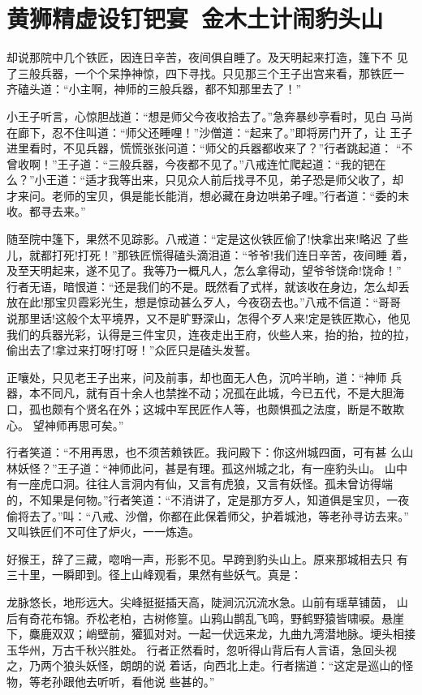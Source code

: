 \chapter{黄狮精虚设钉钯宴~金木土计闹豹头山}

却说那院中几个铁匠，因连日辛苦，夜间俱自睡了。及天明起来打造，篷下不
见了三般兵器，一个个呆挣神惊，四下寻找。只见那三个王子出宫来看，那铁匠一
齐磕头道：“小主啊，神师的三般兵器，都不知那里去了！”

小王子听言，心惊胆战道：“想是师父今夜收拾去了。”急奔暴纱亭看时，见白
马尚在廊下，忍不住叫道：“师父还睡哩！”沙僧道：“起来了。”即将房门开了，让
王子进里看时，不见兵器，慌慌张张问道：“师父的兵器都收来了？”行者跳起道：
“不曾收啊！”王子道：“三般兵器，今夜都不见了。”八戒连忙爬起道：“我的钯在
么？”小王道：“适才我等出来，只见众人前后找寻不见，弟子恐是师父收了，却
才来问。老师的宝贝，俱是能长能消，想必藏在身边哄弟子哩。”行者道：“委的未
收。都寻去来。”

随至院中篷下，果然不见踪影。八戒道：“定是这伙铁匠偷了!快拿出来!略迟
了些儿，就都打死!打死！”那铁匠慌得磕头滴泪道：“爷爷!我们连日辛苦，夜间睡
着，及至天明起来，遂不见了。我等乃一概凡人，怎么拿得动，望爷爷饶命!饶命！”
行者无语，暗恨道：“还是我们的不是。既然看了式样，就该收在身边，怎么却丢
放在此!那宝贝霞彩光生，想是惊动甚么歹人，今夜窃去也。”八戒不信道：“哥哥
说那里话!这般个太平境界，又不是旷野深山，怎得个歹人来!定是铁匠欺心，他见
我们的兵器光彩，认得是三件宝贝，连夜走出王府，伙些人来，抬的抬，拉的拉，
偷出去了!拿过来打呀!打呀！”众匠只是磕头发誓。

正嚷处，只见老王子出来，问及前事，却也面无人色，沉吟半晌，道：“神师
兵器，本不同凡，就有百十余人也禁挫不动；况孤在此城，今已五代，不是大胆海
口，孤也颇有个贤名在外；这城中军民匠作人等，也颇惧孤之法度，断是不敢欺心。
望神师再思可矣。”

行者笑道：“不用再思，也不须苦赖铁匠。我问殿下：你这州城四面，可有甚
么山林妖怪？”王子道：“神师此问，甚是有理。孤这州城之北，有一座豹头山。
山中有一座虎口洞。往往人言洞内有仙，又言有虎狼，又言有妖怪。孤未曾访得端
的，不知果是何物。”行者笑道：“不消讲了，定是那方歹人，知道俱是宝贝，一夜
偷将去了。”叫：“八戒、沙僧，你都在此保着师父，护着城池，等老孙寻访去来。”
又叫铁匠们不可住了炉火，一一炼造。

好猴王，辞了三藏，唿哨一声，形影不见。早跨到豹头山上。原来那城相去只
有三十里，一瞬即到。径上山峰观看，果然有些妖气。真是：

龙脉悠长，地形远大。尖峰挺挺插天高，陡涧沉沉流水急。山前有瑶草铺茵，
山后有奇花布锦。乔松老柏，古树修篁。山鸦山鹊乱飞鸣，野鹤野猿皆啸唳。悬崖
下，麋鹿双双；峭壁前，獾狐对对。一起一伏远来龙，九曲九湾潜地脉。埂头相接
玉华州，万古千秋兴胜处。
行者正然看时，忽听得山背后有人言语，急回头视之，乃两个狼头妖怪，朗朗的说
着话，向西北上走。行者揣道：“这定是巡山的怪物，等老孙跟他去听听，看他说
些甚的。”

